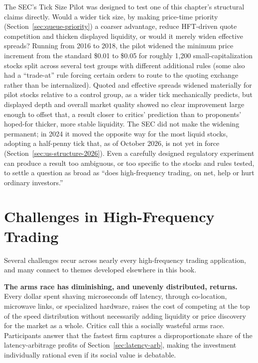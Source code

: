 \documentclass[../ai_in_finance]{subfiles}
\begin{document}
The SEC's Tick Size Pilot was designed to test one of this chapter's structural claims directly. Would a wider tick size, by making price-time priority (Section~\ref{sec:queue-priority}) a coarser advantage, reduce HFT-driven quote competition and thicken displayed liquidity, or would it merely widen effective spreads? Running from 2016 to 2018, the pilot widened the minimum price increment from the standard \$0.01 to \$0.05 for roughly 1,200 small-capitalization stocks split across several test groups with different additional rules (some also had a ``trade-at'' rule forcing certain orders to route to the quoting exchange rather than be internalized). Quoted and effective spreads widened materially for pilot stocks relative to a control group, as a wider tick mechanically predicts, but displayed depth and overall market quality showed no clear improvement large enough to offset that, a result closer to critics' prediction than to proponents' hoped-for thicker, more stable liquidity. The SEC did not make the widening permanent; in 2024 it moved the opposite way for the most liquid stocks, adopting a half-penny tick that, as of October 2026, is not yet in force (Section~\ref{sec:us-structure-2026}). Even a carefully designed regulatory experiment can produce a result too ambiguous, or too specific to the stocks and rules tested, to settle a question as broad as ``does high-frequency trading, on net, help or hurt ordinary investors.''

\section{Challenges in High-Frequency Trading}

Several challenges recur across nearly every high-frequency trading application, and many connect to themes developed elsewhere in this book.

\textbf{The arms race has diminishing, and unevenly distributed, returns.} Every dollar spent shaving microseconds off latency, through co-location, microwave links, or specialized hardware, raises the cost of competing at the top of the speed distribution without necessarily adding liquidity or price discovery for the market as a whole. Critics call this a socially wasteful arms race. Participants answer that the fastest firm captures a disproportionate share of the latency-arbitrage profits of Section~\ref{sec:latency-arb}, making the investment individually rational even if its social value is debatable.
\end{document}

